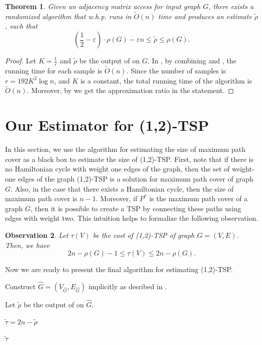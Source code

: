 \documentclass[letterpaper,11pt]{article}
\renewcommand{\epsilon}{\varepsilon}
\newcommand{\tspsize}[1]{\ensuremath{\tau}(#1)}
\newtheorem{theorem}{Theorem}[section]
\newtheorem{observation}[theorem]{Observation}
\newenvironment{myproof}{
\vspace{-0.5cm}
\begin{proof}
}{
\end{proof}
}
\begin{document}
\begin{theorem}\label{thm: disjoint-paths-algorithm}
Given an adjacency matrix access for input graph $G$, there exists a randomized algorithm that w.h.p. runs in $\widetilde{O}(n)$ time and  produces an estimate $\tilde{\rho}$, such that
$$
\left(\frac{1}{2} - \epsilon\right)\cdot\rho(G) - \epsilon n \leq \tilde{\rho} \leq \rho(G).
$$
\end{theorem}
\begin{myproof}
Let $K = \frac{1}{\epsilon}$ and $\tilde{\rho}$ be the output of  on $G$. In , by combining  and , the running time for each sample is $\tilde{O}(n)$. Since the number of samples is $r = 192K^2\log n$, and $K$ is a constant, the total running time of the algorithm is $\tilde{O}(n)$. Moreover, by  we get the approximation ratio in the statement.
\end{myproof}


\section{Our Estimator for (1,2)-TSP}
In this section, we use the algorithm for estimating the size of maximum path cover as a black box to estimate the size of (1,2)-TSP. First, note that if there is no Hamiltonian cycle with weight one edges of the graph, then the set of weight-one edges of the graph (1,2)-TSP is a solution for maximum path cover of graph $G$. Also, in the case that there exists a Hamiltonian cycle, then the size of maximum path cover is $n-1$. Moreover, if $P^*$ is the maximum path cover of a graph $G$, then it is possible to create a TSP by connecting these paths using edges with weight two. This intuition helps to formalize the following observation.

\begin{observation}\label{obs: bounding-TSP-with-DP}
Let $\tspsize{V}$ be the cost of (1,2)-TSP of graph $G = (V, E)$. Then, we have 
$$2n - \rho(G) - 1 \leq \tspsize{V} \leq 2n - \rho(G).$$
\end{observation}

Now we are ready to present the final algorithm for estimating (1,2)-TSP.


\begin{algorithm}
\caption{Final algorithm for (1,2)-TSP.}
\label{alg: 12tsp}

    Construct $\hat{G} = (V_{\hat{G}}, E_{\hat{G}})$ implicitly as desribed in .
    
    Let $\tilde{\rho}$ be the output of  on $\hat{G}$.
    
    $\tilde{\tau} = 2n - \tilde{\rho}$
    
    \Return $\tilde{\tau}$
\end{algorithm}
\end{document}

